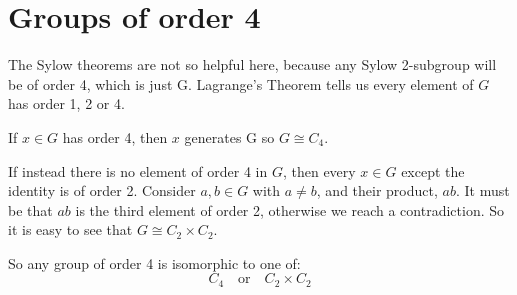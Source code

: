 \section{Groups of order 4}
The Sylow theorems are not so helpful here, because any Sylow 2-subgroup will be of order 4, which
is just G.
Lagrange's Theorem tells us every element of \(G\) has order 1, 2 or 4.

If \(x \in G\) has order 4, then \(x\) generates G so \(G \cong C_4\).

If instead there is no element of order 4 in \(G\), then every \(x \in G\) except the identity is of
order 2.
Consider \(a, b \in G\) with \(a \neq b\), and their product, \(ab\).
It must be that \(ab\) is the third element of order 2, otherwise we reach a contradiction.
So it is easy to see that \(G \cong C_2 \times C_2\).

So any group of order 4 is isomorphic to one of:
\[C_4 \quad \text{or} \quad C_2 \times C_2\]

